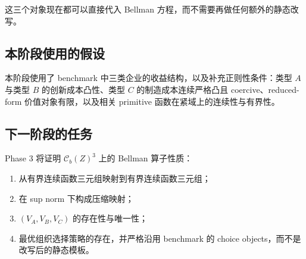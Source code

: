 这三个对象现在都可以直接代入 Bellman 方程，而不需要再做任何额外的静态改写。

\subsection{本阶段使用的假设}

本阶段使用了 benchmark 中三类企业的收益结构，以及补充正则性条件：类型 $A$ 与类型 $B$ 的创新成本凸性、类型 $C$ 的制造成本连续严格凸且 coercive、reduced-form 价值对象有限，以及相关 primitive 函数在紧域上的连续性与有界性。

\subsection{下一阶段的任务}

Phase 3 将证明 $\mathcal C_b(Z)^3$ 上的 Bellman 算子性质：
\begin{enumerate}
    \item 从有界连续函数三元组映射到有界连续函数三元组；
    \item 在 sup norm 下构成压缩映射；
    \item $(V_A,V_B,V_C)$ 的存在性与唯一性；
    \item 最优组织选择策略的存在，并严格沿用 benchmark 的 choice objects，而不是改写后的静态模板。
\end{enumerate}
